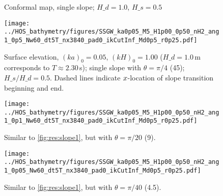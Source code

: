 \begin{figure}[h!ptb]%
\centering
{}%
%
%
\caption{Conformal map, single slope; $H\_d = 1.0$, $H\_s = 0.5$}%
\label{fig:res:map_slope}%
\end{figure}

\begin{figure}[h!ptb]%
\centering
\texttt{[image: ../HOS\_bathymetry/figures/SSGW\_ka0p05\_M5\_H1p00\_0p50\_nH2\_ang1\_0p5\_Nw60\_dt5T\_nx3840\_pad0\_ikCutInf\_Md0p5\_r0p25.pdf]}%
\caption{Surface elevation, $(ka)_0 = 0.05$, $(kH)_0 = 1.00$ ($H\_d=1.0$\,m corresponds to $T\approx2.30$\,s); single slope with $\theta=\pi/4$ (45\textdegree); $H\_s/H\_d = 0.5$. Dashed lines indicate $x$-location of slope transition beginning and end.}%
\label{fig:res:slope1}%
\end{figure}
\begin{figure}[h!ptb]%
\centering 
\texttt{[image: ../HOS\_bathymetry/figures/SSGW\_ka0p05\_M5\_H1p00\_0p50\_nH2\_ang1\_0p1\_Nw60\_dt5T\_nx3840\_pad0\_ikCutInf\_Md0p5\_r0p25.pdf]}%
\caption{Similar to \autoref{fig:res:slope1}, but with $\theta=\pi/20$  (9\textdegree).}%
\label{fig:res:slope2}%
\end{figure}
\begin{figure}[h!ptb]%
\centering 															  
\texttt{[image: ../HOS\_bathymetry/figures/SSGW\_ka0p05\_M5\_H1p00\_0p50\_nH2\_ang1\_0p05\_Nw60\_dt5T\_nx3840\_pad0\_ikCutInf\_Md0p5\_r0p25.pdf]}%
\caption{Similar to \autoref{fig:res:slope1}, but with $\theta=\pi/40$ (4.5\textdegree).}%
\label{fig:res:slope3}%
\end{figure}








%